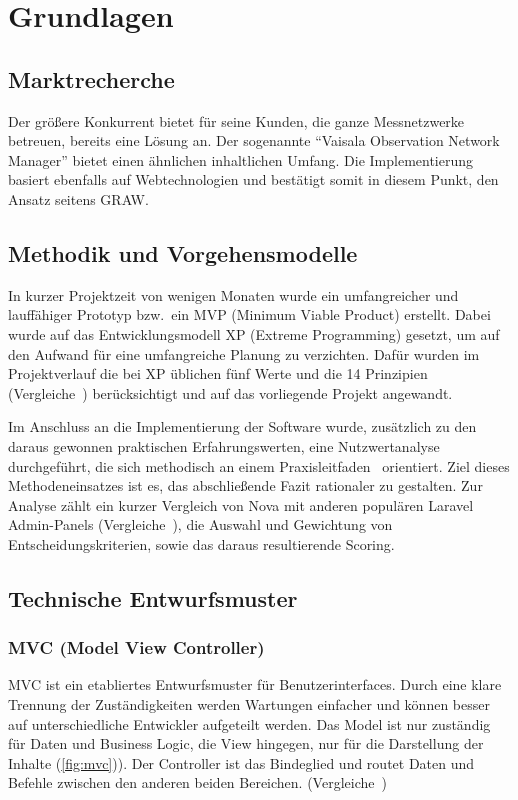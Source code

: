 \section{Grundlagen}

\subsection{Marktrecherche}
Der größere Konkurrent bietet für seine Kunden, die ganze Messnetzwerke betreuen, bereits eine Lösung an.
Der sogenannte \enquote{Vaisala Observation Network Manager}\cite{observation-network-manager} bietet einen ähnlichen inhaltlichen Umfang.
Die Implementierung basiert ebenfalls auf Webtechnologien und bestätigt somit in diesem Punkt, den Ansatz seitens GRAW.

\subsection{Methodik und Vorgehensmodelle}
In kurzer Projektzeit von wenigen Monaten wurde ein umfangreicher und lauffähiger Prototyp bzw.\ ein MVP (Minimum Viable Product) erstellt.
Dabei wurde auf das Entwicklungsmodell XP (Extreme Programming) gesetzt, um auf den Aufwand für eine umfangreiche Planung zu verzichten.
Dafür wurden im Projektverlauf die bei XP üblichen fünf Werte und die 14 Prinzipien (Vergleiche~\cite{agile-prozesse}) berücksichtigt und auf das vorliegende Projekt angewandt.

Im Anschluss an die Implementierung der Software wurde, zusätzlich zu den daraus gewonnen praktischen Erfahrungswerten, eine Nutzwertanalyse durchgeführt, die sich methodisch an einem Praxisleitfaden~\cite{scoring-und-nutzwertanalysen} orientiert.
Ziel dieses Methodeneinsatzes ist es, das abschließende Fazit rationaler zu gestalten.
Zur Analyse zählt ein kurzer Vergleich von Nova mit anderen populären Laravel Admin-Panels (Vergleiche~\cite{the-guide-to-laravel-admin-panels}), die Auswahl und Gewichtung von Entscheidungskriterien, sowie das daraus resultierende Scoring.

\subsection{Technische Entwurfsmuster}

\subsubsection{MVC (Model View Controller)}
MVC ist ein etabliertes Entwurfsmuster für Benutzerinterfaces.
Durch eine klare Trennung der Zuständigkeiten werden Wartungen einfacher und können besser auf unterschiedliche Entwickler aufgeteilt werden.
Das Model ist nur zuständig für Daten und Business Logic, die View hingegen, nur für die Darstellung der Inhalte (\ref{fig:mvc})).
Der Controller ist das Bindeglied und routet Daten und Befehle zwischen den anderen beiden Bereichen.
(Vergleiche~\cite{mdn-glossary-mvc})

